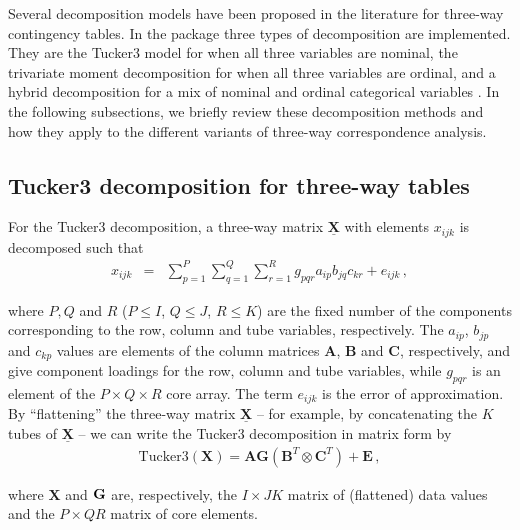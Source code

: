 Several decomposition models have been proposed in the literature for three-way contingency tables. In the  package three types of decomposition are implemented. They are the Tucker3 model \cite[]{tuc63,kro83,kro08,kie92} for when all three variables are nominal,  the trivariate moment decomposition \cite[]{lomkrobeh16,lombehkro21} for when all three variables are ordinal, and a hybrid decomposition for a mix of nominal and ordinal categorical variables \cite[]{lombeh17}.  In the following subsections, we briefly review these decomposition methods and how they apply to the different variants of three-way correspondence analysis. 

\subsection{Tucker3 decomposition for three-way tables}
\label{s.31}

For the Tucker3 decomposition, a three-way matrix $\underline{\mathbf{X}}$ with elements $x_{ijk}$ is decomposed such that
\begin{eqnarray*}
x_{ijk} & = &\sum_{p=1}^{P}\sum_{q=1}^{Q}\sum_{r=1}^{R}g_{pqr}a_{ip}b_{jq}
c_{kr} + e_{ijk} \,,
\end{eqnarray*}

\noindent where ${P, Q}$ and $R$ ($P \leq I$, $Q \leq J$, $R \leq K$) are the fixed number of the components corresponding to the row, column and tube variables,  respectively. The $a_{ip}$, $b_{jp}$ and $c_{kp}$ values are elements of the column matrices $\mathbf{A}$, $\mathbf{B}$ and $\mathbf{C}$, respectively, and give component loadings for the row, column and tube variables, while $g_{pqr}$ is an element of the $P \times Q \times R$  core array. 
 The term $e_{ijk}$ is the error of approximation. By ``flattening'' the three-way matrix $\underline{\mathbf{X}}$ -- for example, by concatenating the $K$ tubes of $\underline{\mathbf{X}}$ -- we can write the Tucker3 decomposition in matrix form by
\begin{eqnarray}
	\label{eq:Tucker3}
	\textrm{Tucker3}\left(\mathbf{X}\right) = \mathbf{A G}\left(\mathbf{ B}^{T} \otimes \mathbf{C}^{T}\right) + \mathbf{E} \,,
\end{eqnarray}

\noindent where $\mathbf{X}$ and ${\bf G}$ are, respectively, the $I\times JK$ matrix of (flattened) data values and the $P\times QR$ matrix of core elements. 

